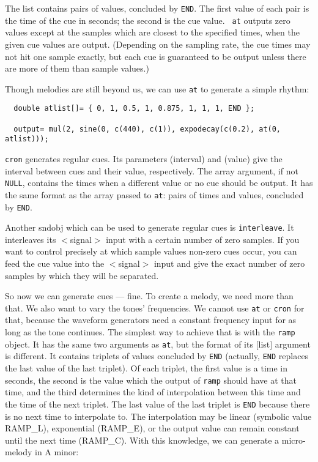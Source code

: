 \documentclass{article}
\def\bv{\begin{verbatim}}
\begin{document}
The list contains pairs of values, concluded by {\tt END}.  The first value of
each pair is the time of the cue in seconds; the second is the cue value.  {\tt
at} outputs zero values except at the samples which are closest to the
specified times, when the given cue values are output.  (Depending on the
sampling rate, the cue times may not hit one sample exactly, but each cue is
guaranteed to be output unless there are more of them than sample values.)

Though melodies are still beyond us, we can use {\tt at} to generate a simple
rhythm:

\bv
  double atlist[]= { 0, 1, 0.5, 1, 0.875, 1, 1, 1, END };

  output= mul(2, sine(0, c(440), c(1)), expodecay(c(0.2), at(0, atlist)));
\end{verbatim}

{\tt cron} generates regular cues.  Its parameters (interval) and (value) give
the interval between cues and their value, respectively.  The array argument,
if not {\tt NULL}, contains the times when a different value or no cue should
be output.  It has the same format as the array passed to {\tt at}: pairs of
times and values, concluded by {\tt END}.

Another sndobj which can be used to generate regular cues is {\tt interleave}.
It interleaves its $<$signal$>$ input with a certain number of zero samples.
If you want to control precisely at which sample values non-zero cues occur,
you can feed the cue value into the $<$signal$>$ input and give the exact
number of zero samples by which they will be separated.

So now we can generate cues --- fine.  To create a melody, we need more than
that.  We also want to vary the tones' frequencies.  We cannot use {\tt at} or
{\tt cron} for that, because the waveform generators need a constant frequency
input for as long as the tone continues.  The simplest way to achieve that is
with the {\tt ramp} object.  It has the same two arguments as {\tt at}, but the
format of its $[$list$]$ argument is different.  It contains triplets of values
concluded by {\tt END} (actually, {\tt END} replaces the last value of the last
triplet).  Of each triplet, the first value is a time in seconds, the second is
the value which the output of {\tt ramp} should have at that time, and the
third determines the kind of interpolation between this time and the time of
the next triplet.  The last value of the last triplet is {\tt END} because
there is no next time to interpolate to.  The interpolation may be linear
(symbolic value RAMP\_L), exponential (RAMP\_E), or the output value can remain
constant until the next time (RAMP\_C).  With this knowledge, we can generate a
micro-melody in A minor:
\end{document}
